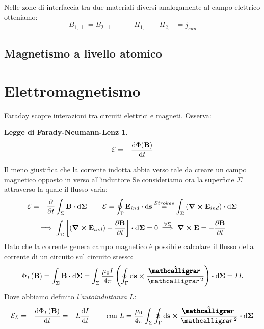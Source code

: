\documentclass[12pt,a4paper]{article}
\begin{document}
Nelle zone di interfaccia tra due materiali diversi analogamente al campo elettrico otteniamo:
\begin{equation*}
    B_{1,\perp}= B_{2,\perp}\qquad\quad H_{1,\parallel}-H_{2,\parallel}= j_{sup}
\end{equation*}

\subsection{Magnetismo a livello atomico}



\section{Elettromagnetismo}

Faraday scopre interazioni tra circuiti elettrici e magneti. Osserva:
\newtheorem*{FNL}{Legge di Farady-Neumann-Lenz}
\begin{FNL}
    \begin{equation*}
        \mathcal{E}= - \dv{\Phi(\vb{B})}{t}
    \end{equation*}
\end{FNL}
Il meno giustifica che la corrente indotta abbia verso tale da creare un campo magnetico opposto in verso all'induttore
Se consideriamo ora la superficie $\Sigma$ attraverso la quale il flusso varia:
\begin{equation*}
    \mathcal{E}= - \pdv{}{t}\int_\Sigma\vb{B}\vdot\dd{\vb{\Sigma}}\qquad \mathcal{E}= \oint_\Gamma 
    \vb{E}_{ind}\vdot \dd{\vb{s}}\overset{Strokes}{=} \int_\Sigma\left( \curl{\vb{E}_{ind}} \right)\vdot\dd{\vb{\Sigma}}
\end{equation*}
\begin{equation*}
    \implies \int_\Sigma\left[ \left( \curl{\vb{E}_{ind}} \right)+\pdv{\vb{B}}{t} \right]\vdot\dd{\vb{\Sigma}}= 0
    \overset{\forall\Sigma}{\implies} \curl{\vb{E}}= -\pdv{\vb{B}}{t}
\end{equation*}
Dato che la corrente genera campo magnetico è possibile calcolare il flusso della corrente di un circuito sul circuito stesso:
\begin{equation*}
    \Phi_L(\vb{B})= \int_\Sigma\vb{B}\vdot\dd{\vb{\Sigma}}= \int_\Sigma\frac{\mu_0I}{4\pi}
    \left( \oint_\Gamma \dd{\vb{s}}\cp \frac{\vu{\boldscriptr}}{\scriptr^2} \right)\vdot \dd{\vb{\Sigma}}= IL
\end{equation*}
Dove abbiamo definito \textit{l'autoinduttanza} $L$:
\begin{equation*}
    \mathcal{E}_L= - \dv{\Phi_L(\vb{B})}{t}= -L\dv{I}{t} \qquad \text{ con } L = \frac{\mu_0}{4\pi}\int_\Sigma\oint_\Gamma\dd{\vb{s}}\cp\frac{\vu{\boldscriptr}}{\scriptr^2}\vdot \dd{\vb{\Sigma}}
\end{equation*}
\end{document}
